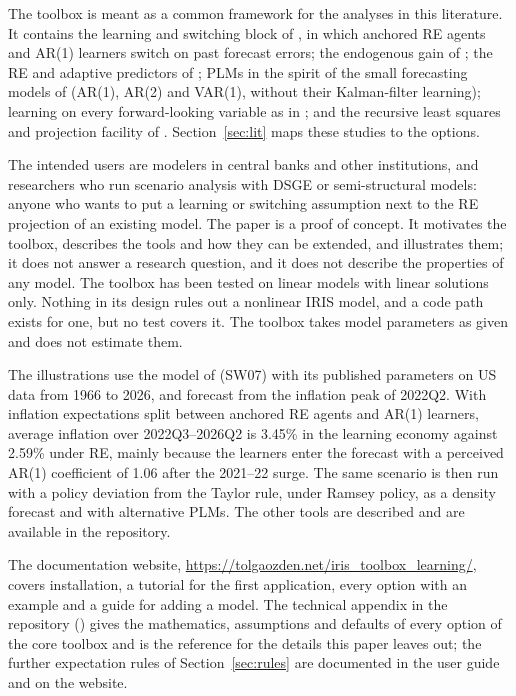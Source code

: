 \documentclass[pdflatex,sn-basic]{sn-jnl}
\DeclareRobustCommand{\code}[1]{\texttt{\detokenize{#1}}}
\begin{document}
The toolbox is meant as a common framework for the analyses in this literature. It contains the
learning and switching block of \citet{ozden2025}, in which anchored RE agents and AR(1)
learners switch on past forecast errors; the endogenous gain of \citet{koz2024}; the RE and
adaptive predictors of \citet{branch2009,branch2010}; PLMs in the spirit of the small
forecasting models of \citet{slobodyan2012a} (AR(1), AR(2) and VAR(1), without their
Kalman-filter learning);
learning on every forward-looking variable as in \citet{milani2007}; and the recursive least
squares and projection facility of \citet{evans2001}. Section~\ref{sec:lit} maps these studies
to the options.

The intended users are modelers in central banks and other institutions, and researchers who run
scenario analysis with DSGE or semi-structural models: anyone who wants to put a learning or
switching assumption next to the RE projection of an existing model. The paper is a proof of
concept. It motivates the toolbox, describes the tools and how they can be extended, and
illustrates them; it does not answer a research question, and it does not describe the
properties of any model. The toolbox has been tested on linear models with linear solutions
only. Nothing in its design rules out a nonlinear IRIS model, and a code path exists for one,
but no test covers it. The toolbox takes model parameters as given and does not estimate them.

The illustrations use the model of \citet{smets2007} (SW07) with its published parameters on US
data from 1966 to 2026, and forecast from the inflation peak of 2022Q2. With inflation
expectations split between anchored RE agents and AR(1) learners, average inflation over
2022Q3--2026Q2 is 3.45\% in the learning economy against 2.59\% under RE, mainly because the
learners enter the forecast with a perceived AR(1) coefficient of 1.06 after the 2021--22 surge. The same
scenario is then run with a policy deviation from the Taylor rule, under Ramsey policy, as a
density forecast and with alternative PLMs. The other tools are described and are available in
the repository.

The documentation website, \url{https://tolgaozden.net/iris_toolbox_learning/},
covers installation, a tutorial for the first application, every option with an example and a
guide for adding a model. The technical appendix in the repository
(\code{docs/technical_appendix/}) gives the mathematics, assumptions and defaults of every option
of the core toolbox and is the reference for the details this paper leaves out; the further
expectation rules of Section~\ref{sec:rules} are documented in the user guide and on the website.
\end{document}
